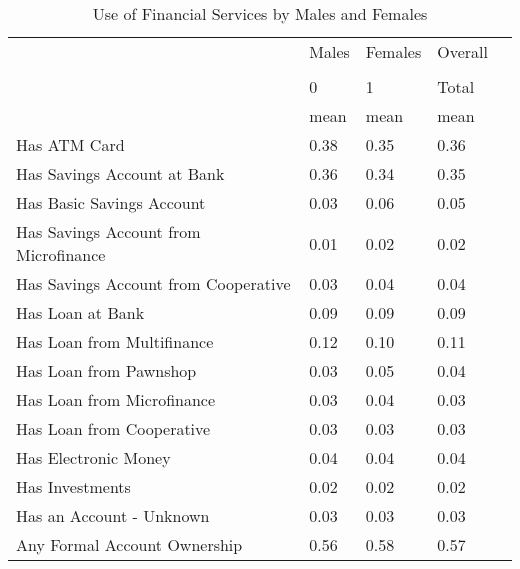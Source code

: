  \begin{table}[H] \begin{adjustbox}{max width=\textwidth} \begin{threeparttable} \caption{Use of Financial Services by Males and Females} \label{servgender} {\begin{tabular}{l*{1}{llll}} \hline  & Males & Females & Overall \\
                                                                                &\multicolumn{3}{c}{}         \\
                                                                                &        0&        1&    Total\\
                                                                                &     mean&     mean&     mean\\
\hline
Has ATM Card                                                                    &     0.38&     0.35&     0.36\\
Has Savings Account at Bank                                                     &     0.36&     0.34&     0.35\\
Has Basic Savings Account                                                       &     0.03&     0.06&     0.05\\
Has Savings Account from Microfinance                                           &     0.01&     0.02&     0.02\\
Has Savings Account from Cooperative                                            &     0.03&     0.04&     0.04\\
Has Loan at Bank                                                                &     0.09&     0.09&     0.09\\
Has Loan from Multifinance                                                      &     0.12&     0.10&     0.11\\
Has Loan from Pawnshop                                                          &     0.03&     0.05&     0.04\\
Has Loan from Microfinance                                                      &     0.03&     0.04&     0.03\\
Has Loan from Cooperative                                                       &     0.03&     0.03&     0.03\\
Has Electronic Money                                                            &     0.04&     0.04&     0.04\\
Has Investments                                                                 &     0.02&     0.02&     0.02\\
Has an Account - Unknown                                                        &     0.03&     0.03&     0.03\\
Any Formal Account Ownership                                                    &     0.56&     0.58&     0.57\\
\hline
\end{tabular}} \end{threeparttable} \end{adjustbox} \end{table} \vspace*{-5mm}
